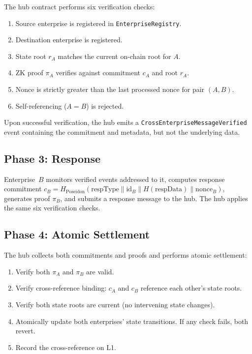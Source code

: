 \documentclass[conference]{IEEEtran}
\begin{document}
The hub contract performs six verification checks:
\begin{enumerate}
  \item Source enterprise is registered in \texttt{EnterpriseRegistry}.
  \item Destination enterprise is registered.
  \item State root $r_A$ matches the current on-chain root for $A$.
  \item ZK proof $\pi_A$ verifies against commitment $c_A$ and root $r_A$.
  \item Nonce is strictly greater than the last processed nonce for pair
        $(A, B)$.
  \item Self-referencing ($A = B$) is rejected.
\end{enumerate}

Upon successful verification, the hub emits a
\texttt{CrossEnterpriseMessageVerified} event containing the commitment and
metadata, but not the underlying data.

\subsection{Phase 3: Response}

Enterprise~$B$ monitors verified events addressed to it, computes response
commitment $c_B = H_{\text{Poseidon}}(\text{respType} \| \text{id}_B \|
H(\text{respData}) \| \text{nonce}_B)$, generates proof $\pi_B$, and submits
a response message to the hub. The hub applies the same six verification
checks.

\subsection{Phase 4: Atomic Settlement}

The hub collects both commitments and proofs and performs atomic settlement:

\begin{enumerate}
  \item Verify both $\pi_A$ and $\pi_B$ are valid.
  \item Verify cross-reference binding: $c_A$ and $c_B$ reference each
        other's state roots.
  \item Verify both state roots are current (no intervening state changes).
  \item Atomically update both enterprises' state transitions. If any check
        fails, both revert.
  \item Record the cross-reference on L1.
\end{enumerate}
\end{document}
